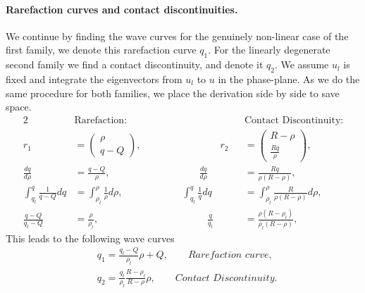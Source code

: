 \documentclass[10pt]{article}
\numberwithin{equation}{section}
\begin{document}
\paragraph{Rarefaction curves and contact discontinuities.}
We continue by finding the wave curves for the genuinely non-linear case of the first family, we denote this rarefaction curve $q_1$. For the linearly degenerate second family we find a contact discontinuity, and denote it $q_2$. We assume $u_l$ is fixed and integrate the eigenvectors from $u_l$ to $u$ in the phase-plane. As we do the same procedure for both families, we place the derivation side by side to save space.  
\begin{alignat*}{2}
    & \text{Rarefaction:}  && \text{Contact Discontinuity:} \\
    r_1 &= \begin{pmatrix} \rho \\ q - Q \end{pmatrix}, \quad\quad \quad\quad\quad \quad\quad\quad   r_2 &&= \begin{pmatrix} R - \rho \\ \frac{Rq}{\rho} \end{pmatrix}, \\ 
    \frac{dq}{d\rho} &= \frac{q-Q}{\rho}, \quad\quad \quad\quad\quad\quad\quad\quad\quad  \frac{dq}{d\rho} &&= \frac{Rq}{\rho(R-\rho)},  \\
    \int_{q_l}^{q} \frac{1}{q-Q} dq &= \int_{\rho_l}^{\rho} \frac{1}{\rho} d\rho, \quad\quad\quad \quad\quad\quad \int_{q_l}^{q} \frac{1}{q} dq &&= \int_{\rho_l}^{\rho} \frac{R}{\rho(R - \rho)} d\rho, \\
    \frac{q-Q}{q_l -Q} &= \frac{\rho}{\rho_l}, \quad \quad\quad\quad\quad\quad\quad\quad\quad\quad\quad  \frac{q}{q_l} &&= \frac{\rho( R- \rho_l)}{\rho_l(R-\rho)},
\end{alignat*}
This leads to the following wave curves
\begin{align}
    & q_1 = \frac{q_l - Q}{\rho_l} \rho + Q, \quad \quad \textit{Rarefaction curve,}
    \label{Eq:RarefactionWCongestedPh} \\
    &  q_2 = \frac{q_l}{\rho_l} \frac{R - \rho_l}{R- \rho} \rho,   \quad \quad \textit{Contact Discontinuity.}
    \label{Eq:ContactDiscCongestedPh}
\end{align}
\end{document}
